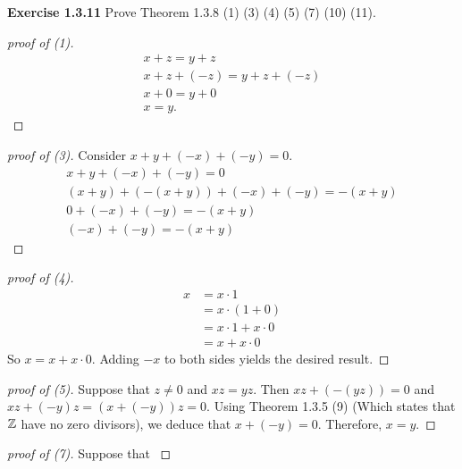 \noindent \textbf{Exercise 1.3.11} Prove Theorem 1.3.8 (1) (3) (4) (5) (7) (10) (11).
\begin{proof}[proof of (1)]
    \begin{gather*}
        x+z = y+z\\
        x + z + (-z) = y + z + (-z) \\
        x + 0 = y + 0\\
        x = y.
    \end{gather*}
\end{proof}
\begin{proof}[proof of (3)]
    Consider \(x + y + (-x) + (-y) = 0\).
    \begin{gather*}
        x+y + (-x) + (-y) = 0\\
        (x+y) + (-(x+y)) + (-x) + (-y) = -(x+y)\\
        0 + (-x) + (-y) = -(x+y)\\
        (-x) + (-y) = -(x+y)
    \end{gather*}
\end{proof}
\begin{proof}[proof of (4)]
    \begin{align*}
        x &= x \cdot 1 \\
        &= x \cdot (1 + 0) \\
        &= x \cdot 1 + x \cdot 0 \\
        &= x + x \cdot 0
    \end{align*}
    So \(x = x + x\cdot 0\). Adding \(-x\) to both sides yields the desired result.
\end{proof}
\begin{proof}[proof of (5)]
    Suppose that \(z \neq 0\) and \(xz = yz\). Then \(xz + (-(yz)) = 0\) and \(xz + (-y)z = (x + (-y))z = 0\).
    Using Theorem 1.3.5 (9) (Which states that \(\mathbb{Z}\) have no zero divisors), we deduce that \(x + (-y) = 0\). Therefore, \(x = y\).
\end{proof}
\begin{proof}[proof of (7)]
    Suppose that \(\)
\end{proof}